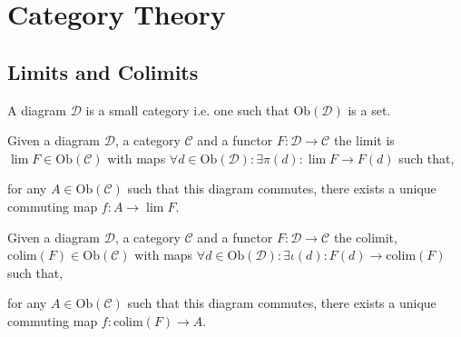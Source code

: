 \documentclass[12pt]{extarticle}
\newcommand{\colim}[1]{\mathrm{colim}(#1)}
\newcommand{\Ob}[1]{\mathrm{Ob}(#1)}
\newcommand{\cat}[1]{\mathcal{#1}}
\theoremstyle{definition}
\newenvironment{definition}[1][Definition:]{\begin{trivlist}
\item[\hskip \labelsep {\bfseries #1}]}{\end{trivlist}}
\begin{document}
\section{Category Theory}

\subsection{Limits and Colimits}
\begin{definition}
A diagram $\cat{D}$ is a small category i.e. one such that $\Ob{\cat{D}}$ is a set. 
\end{definition}
\begin{definition}
Given a diagram $\cat{D}$, a category $\cat{C}$ and a functor $F : \cat{D} \to \cat{C}$ the limit is $\lim{F} \in \Ob{\cat{C}}$ with maps $\forall d \in \Ob{\cat{D}} : \exists \pi(d) : \lim{F} \to F(d)$ such that,
\begin{center}
\end{center}
for any $A \in \Ob{\cat{C}}$ such that this diagram commutes, there exists a unique commuting map $f : A \to \lim{F}$. 
\end{definition}

\begin{definition}
Given a diagram $\cat{D}$, a category $\cat{C}$ and a functor $F : \cat{D} \to \cat{C}$ the colimit, $\colim{F} \in \Ob{\cat{C}}$ with maps $\forall d \in \Ob{\cat{D}} : \exists \iota(d) : F(d) \to \colim{F}$ such that,
\begin{center}
\end{center}
for any $A \in \Ob{\cat{C}}$ such that this diagram commutes, there exists a unique commuting map $f : \colim{F} \to A$. 
\end{definition}
\end{document}
